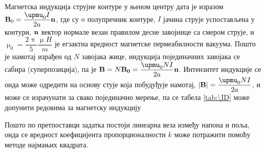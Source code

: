 Магнетска индукција струјне контуре у њеном центру дата је изразом ${\bf B}_0 = \dfrac{\upmu_0 I}{2a} {\bf n}$, где су 
$a$ полупречник контуре, $I$ јачина струје успостављена у контури, ${\bf n}$ вектор нормале везан правилом десне завојнице са 
смером струје, и $\upmu_0 = \dfrac{2\uppi}{5} \unit{\dfrac{\upmu H}{m}}$ је егзактна вредност магнетске пермеабилности вакуума.
Пошто је намотај израђен од $N$ завојака жице, индукција појединачних завојака се сабира (суперпозиција), па је 
${\bf B} = N {\bf B_0} = \dfrac{\upmu_0 N I}{2a} {\bf n}$. Интензитет индукције се онда може одредити на основу 
стује која побудуђује намотај, 
$|{\bf B}| = \dfrac{\upmu_0 N I}{2a}$, и може се израчунати за свако појединачно мерење, па се табела 
\eqref{tab:\ID} може допунити редовима за магнетску индукцију


Пошто по претпоставци задатка постоји линеарна веза између напона и поља, онда се вредност коефицијента пропорционалности $k$ 
може потражити помоћу методе најмањих квадрата. 

